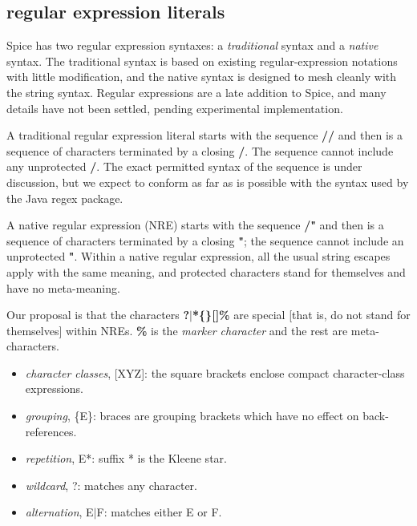 \documentclass{report}
\begin{document}
\subsection{regular expression literals}


Spice has two regular expression syntaxes: a {\em traditional} syntax and a
{\em native} syntax. The traditional syntax is based on existing
regular-expression notations with little modification, and the native
syntax is designed to mesh cleanly with the string syntax. Regular expressions
are a late addition to Spice, and many details have not been settled, pending
experimental implementation.

A traditional regular expression literal starts with the sequence {\bf //} and
then is a sequence of characters terminated by a closing {\bf /}. The sequence
cannot include any unprotected {\bf /}. The exact permitted syntax of the sequence
is under discussion, but we expect to conform as far as is possible with the
syntax used by the Java regex package.

A native regular expression (NRE) starts with the sequence {\bf /"} and then is a
sequence of characters terminated by a closing {\bf "}; the sequence cannot
include an unprotected {\bf "}. Within a native regular expression, all the usual
string escapes apply with the same meaning, and protected characters stand for
themselves and have no meta-meaning.

Our proposal is that the characters {\bf ?$\mid$*\{\}{[}{]}\%} are special {[}that is, do not
stand for themselves{]} within NREs. {\bf \%} is the {\em marker character} and the rest
are meta-characters.

\begin{itemize}\item {\em character classes}, {[}XYZ{]}: the square brackets enclose compact
character-class expressions.

\item {\em grouping}, \{E\}: braces are grouping brackets which have no effect on
back-references.

\item {\em repetition}, E*: suffix * is the Kleene star.

\item {\em wildcard}, ?: matches any character.

\item {\em alternation}, E$\mid$F: matches either E or F.

\end{itemize}
\end{document}

